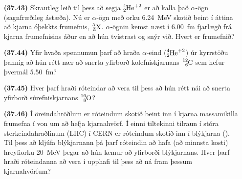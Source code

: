 \ifdefined \wholebook \else\documentclass[oneside]{book}\usepackage{EdlBook}\graphicspath{{figures/}}
\begin{document}
\begin{enumerate}[label = \textbf{(\alph*)}]

\item[\textbf{(37.43)}] Skrautleg leið til þess að segja $\ce{^{4}_{2}He^{+2}}$ er að kalla það $\alpha$-ögn (sagnfræðileg ástæða). Nú er $\alpha$-ögn með orku \SI{6.24}{MeV} skotið beint í áttina að kjarna óþekkts frumefnis, $\ce{^{A}_{Z}X}$. $\alpha$-ögnin kemst næst í \SI{6.00}{fm} fjarlægð frá kjarna frumefnisins áður en að hún tvístrast og snýr við. Hvert er frumefnið?

\item[\textbf{(37.44)}] Yfir hvaða spennumun þarf að hraða $\alpha$-eind ($\ce{^{4}_{2}He^{+2}}$) úr kyrrstöðu þannig að hún rétt nær að snerta yfirborð kolefniskjarnans $\ce{^{12}_{6}C}$ sem hefur þvermál \SI{5.50}{fm}?

\item[\textbf{(37.45)}] Hver þarf hraði róteindar að vera til þess að hún rétt nái að snerta yfirborð súrefniskjarnans $\ce{^{16}_{8}O}$?

\item[\textbf{(37.46)}] Í öreindahröðlum er róteindum skotið beint inn í kjarna massamikilla frumefna í von um að hefja kjarnahvörf. Í einni tiltekinni tilraun í stóra sterkeindahraðlinum (LHC) í CERN er róteindum skotið inn í blýkjarna (). Til þess að kljúfa blýkjarnann þá þarf róteindin að hafa (að minnsta kosti) hreyfiorku \SI{20}{MeV} þegar að hún kemur að yfirborði blýkjarnans. Hver þarf hraði róteindanna að vera í upphafi til þess að ná fram þessum kjarnahvörfum?

\end{enumerate}
\end{document}
